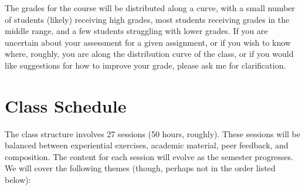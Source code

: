 \documentclass[letterpaper,10pt,headsepline]{scrreprt}
\begin{document}
The grades for the course will be distributed along a curve, with a
small number of students (likely) receiving high grades, most students
receiving grades in the middle range, and a few students struggling
with lower grades. If you are uncertain about your assessment for a
given assignment, or if you wish to know where, roughly, you are along
the distribution curve of the class, or if you would like suggestions
for how to improve your grade, please ask me for clarification.
\clearpage
\section{Class Schedule}
The class structure involves 27 sessions (50 hours, roughly). These
sessions will be balanced between experiential exercises, academic
material, peer feedback, and composition. The content for each session
will evolve as the semester progresses. We will cover the following
themes (though, perhaps not in the order listed below):
\end{document}
